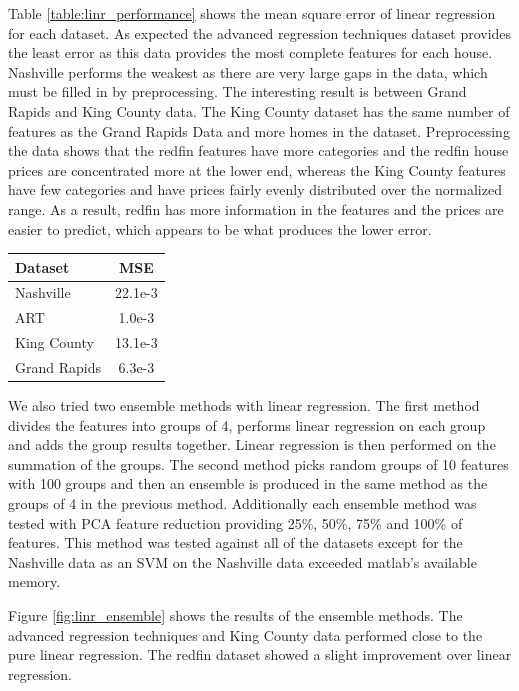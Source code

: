 \documentclass[10pt]{article}
\begin{document}
\begin{multicols}{2}
		Table \ref{table:linr_performance} shows the mean square error of linear regression for each dataset. As expected the advanced regression techniques dataset provides the least error as this data provides the most complete features for each house. Nashville performs the weakest as there are very large gaps in the data, which must be filled in by preprocessing. The interesting result is between Grand Rapids and King County data. The King County dataset has the same number of features as the Grand Rapids Data and more homes in the dataset. Preprocessing the data shows that the redfin features have more categories and the redfin house prices are concentrated more at the lower end, whereas the King County features have few categories and have prices fairly evenly distributed over the normalized range. As a result, redfin has more information in the features and the prices are easier to predict, which appears to be what produces the lower error.

		\begin{center}
      	\captionsetup{type=table}
			\begin{tabular}{l|c}
				Dataset			& MSE \\
				\hline
				Nashville 		& 22.1e-3 \\
				ART 			& 1.0e-3 \\
				King County 	& 13.1e-3 \\
				Grand Rapids 	& 6.3e-3 \\
			\end{tabular}
			\label{table:linr_performance}        
		\end{center}
	
		We also tried two ensemble methods with linear regression. The first method divides the features into groups of 4, performs linear regression on each group and adds the group results together. Linear regression is then performed on the summation of the groups. The second method picks random groups of 10 features with 100 groups and then an ensemble is produced in the same method as the groups of 4 in the previous method. Additionally each ensemble method was tested with PCA feature reduction providing 25\%, 50\%, 75\% and 100\% of features. This method was tested against all of the datasets except for the Nashville data as an SVM on the Nashville data exceeded matlab's available memory.

        Figure \ref{fig:linr_ensemble} shows the results of the ensemble methods. The advanced regression techniques and King County data performed close to the pure linear regression. The redfin dataset showed a slight improvement over linear regression.


\end{multicols}
\end{document}
